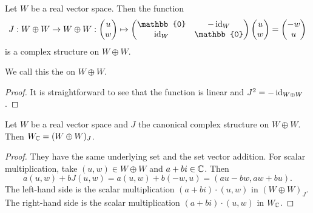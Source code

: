 \begin{lemma}
Let $W$ be a real vector space. Then the function
\[ J: W\oplus W \to W\oplus W: \begin{pmatrix}
u \\ w
\end{pmatrix} \mapsto \begin{pmatrix}
\mathbb{0} & -\id_W \\
\id_W & \mathbb{0}
\end{pmatrix}\begin{pmatrix}
u \\ w
\end{pmatrix} = \begin{pmatrix}
-w \\ u
\end{pmatrix} \]
is a complex structure on $W\oplus W$.
\end{lemma}
We call this the  on $W\oplus W$.
\begin{proof}
It is straightforward to see that the function is linear and $J^2 = -\operatorname{id}_{W\oplus W}$.
\end{proof}


\begin{lemma} \label{complexificationAsSpaceSquaredWithCanonicalComplexStructure}
Let $W$ be a real vector space and $J$ the canonical complex structure on $W\oplus W$. Then $W_{\mathbb{C}} = (W\oplus W)_J$.
\end{lemma}
\begin{proof}
They have the same underlying set and the set vector addition. For scalar multiplication, take $(u,w)\in W\oplus W$ and $a+bi\in \mathbb{C}$. Then
\[ a(u,w) + bJ(u,w) = a(u,w) + b(-w, u) = (au-bw, aw + bu). \]
The left-hand side is the scalar multiplication $(a+bi)\cdot (u,w)$ in $(W\oplus W)_J$. The right-hand side is the scalar multiplication $(a+bi)\cdot (u,w)$ in $W_{\mathbb{C}}$.
\end{proof}

